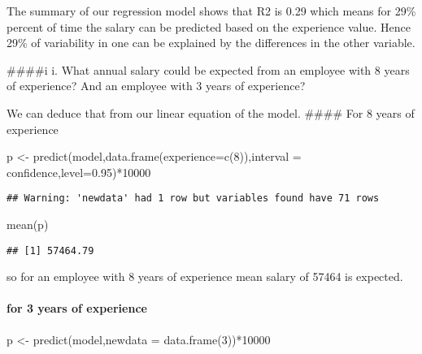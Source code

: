 \documentclass[
]{article}
\newenvironment{Shaded}{\begin{snugshade}}{\end{snugshade}}
\newcommand{\AttributeTok}[1]{\textcolor[rgb]{0.77,0.63,0.00}{#1}}
\newcommand{\DecValTok}[1]{\textcolor[rgb]{0.00,0.00,0.81}{#1}}
\newcommand{\FloatTok}[1]{\textcolor[rgb]{0.00,0.00,0.81}{#1}}
\newcommand{\FunctionTok}[1]{\textcolor[rgb]{0.00,0.00,0.00}{#1}}
\newcommand{\NormalTok}[1]{#1}
\newcommand{\OtherTok}[1]{\textcolor[rgb]{0.56,0.35,0.01}{#1}}
\newcommand{\SpecialCharTok}[1]{\textcolor[rgb]{0.00,0.00,0.00}{#1}}
\newcommand{\StringTok}[1]{\textcolor[rgb]{0.31,0.60,0.02}{#1}}
\begin{document}
The summary of our regression model shows that R2 is 0.29 which means
for 29\% percent of time the salary can be predicted based on the
experience value. Hence 29\% of variability in one can be explained by
the differences in the other variable.

\#\#\#\#i i. What annual salary could be expected from an employee with
8 years of experience? And an employee with 3 years of experience?

We can deduce that from our linear equation of the model. \#\#\#\# For 8
years of experience

\begin{Shaded}
\begin{Highlighting}[]
\NormalTok{p }\OtherTok{\textless{}{-}} \FunctionTok{predict}\NormalTok{(model,}\FunctionTok{data.frame}\NormalTok{(}\StringTok{\textquotesingle{}experience\textquotesingle{}}\OtherTok{=}\FunctionTok{c}\NormalTok{(}\DecValTok{8}\NormalTok{)),}\AttributeTok{interval =} \StringTok{\textquotesingle{}confidence\textquotesingle{}}\NormalTok{,}\AttributeTok{level=}\FloatTok{0.95}\NormalTok{)}\SpecialCharTok{*}\DecValTok{10000}
\end{Highlighting}
\end{Shaded}

\begin{verbatim}
## Warning: 'newdata' had 1 row but variables found have 71 rows
\end{verbatim}

\begin{Shaded}
\begin{Highlighting}[]
\FunctionTok{mean}\NormalTok{(p)}
\end{Highlighting}
\end{Shaded}

\begin{verbatim}
## [1] 57464.79
\end{verbatim}

so for an employee with 8 years of experience mean salary of 57464 is
expected.

\hypertarget{for-3-years-of-experience}{%
\paragraph{for 3 years of experience}\label{for-3-years-of-experience}}

\begin{Shaded}
\begin{Highlighting}[]
\NormalTok{p }\OtherTok{\textless{}{-}} \FunctionTok{predict}\NormalTok{(model,}\AttributeTok{newdata =} \FunctionTok{data.frame}\NormalTok{(}\DecValTok{3}\NormalTok{))}\SpecialCharTok{*}\DecValTok{10000}
\end{Highlighting}
\end{Shaded}
\end{document}
